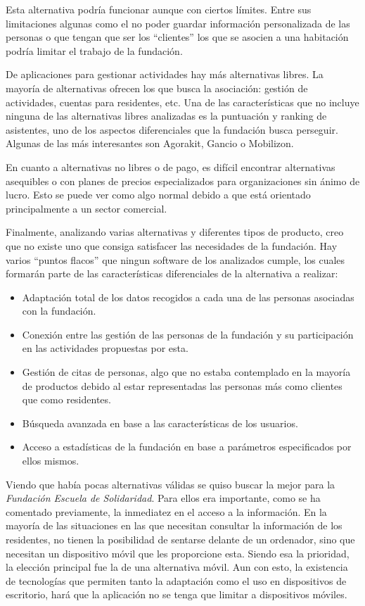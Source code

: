 Esta alternativa podría funcionar aunque con ciertos límites. Entre sus limitaciones algunas como el no poder guardar información personalizada de las personas o que tengan que ser los ``clientes'' los que se asocien a una habitación podría limitar el trabajo de la fundación.

De aplicaciones para gestionar actividades hay más alternativas libres. La mayoría de alternativas ofrecen los que busca la asociación: gestión de actividades, cuentas para residentes, etc. Una de las características que no incluye ninguna de las alternativas libres analizadas es la puntuación y ranking de asistentes, uno de los aspectos diferenciales que la fundación busca perseguir. Algunas de las más interesantes son Agorakit, Gancio o Mobilizon.

En cuanto a alternativas no libres o de pago, es difícil encontrar alternativas asequibles o con planes de precios especializados para organizaciones sin ánimo de lucro. Esto se puede ver como algo normal debido a que está orientado principalmente a un sector comercial.

Finalmente, analizando varias alternativas y diferentes tipos de producto, creo que no existe uno que consiga satisfacer las necesidades de la fundación. Hay varios ``puntos flacos'' que ningun software de los analizados cumple, los cuales formarán parte de las características diferenciales de la alternativa a realizar:

\begin{itemize}
    \item Adaptación total de los datos recogidos a cada una de las personas asociadas con la fundación.
    \item Conexión entre las gestión de las personas de la fundación y su participación en las actividades propuestas por esta.
    \item Gestión de citas de personas, algo que no estaba contemplado en la mayoría de productos debido al estar representadas las personas más como clientes que como residentes.
    \item Búsqueda avanzada en base a las características de los usuarios.
    \item Acceso a estadísticas de la fundación en base a parámetros especificados por ellos mismos.
\end{itemize}

Viendo que había pocas alternativas válidas se quiso buscar la mejor para la \textit{Fundación Escuela de Solidaridad}. Para ellos era importante, como se ha comentado previamente, la inmediatez en el acceso a la información. En la mayoría de las situaciones en las que necesitan consultar la información de los residentes, no tienen la posibilidad de sentarse delante de un ordenador, sino que necesitan un dispositivo móvil que les proporcione esta. Siendo esa la prioridad, la elección principal fue la de una alternativa móvil. Aun con esto, la existencia de tecnologías que permiten tanto la adaptación como el uso en dispositivos de escritorio, hará que la aplicación no se tenga que limitar a dispositivos móviles.